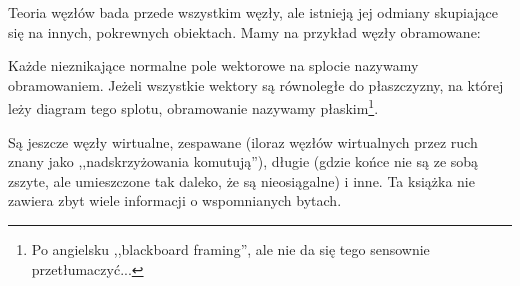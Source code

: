 Teoria węzłów bada przede wszystkim węzły, ale istnieją jej odmiany skupiające się na innych, pokrewnych obiektach.
Mamy na przykład węzły obramowane:

\begin{definition}[obramowanie]
%
%
    Każde nieznikające normalne pole wektorowe na splocie nazywamy obramowaniem.
    Jeżeli wszystkie wektory są równoległe do płaszczyzny, na której leży diagram tego splotu, obramowanie nazywamy płaskim\footnote{Po angielsku ,,blackboard framing'', ale nie da się tego sensownie przetłumaczyć...}.
\end{definition}


Są jeszcze węzły wirtualne, zespawane (iloraz węzłów wirtualnych przez ruch znany jako ,,nadskrzyżowania komutują''), długie (gdzie końce nie są ze sobą zszyte, ale umieszczone tak daleko, że są nieosiągalne) i inne.
Ta książka nie zawiera zbyt wiele informacji o wspomnianych bytach.

